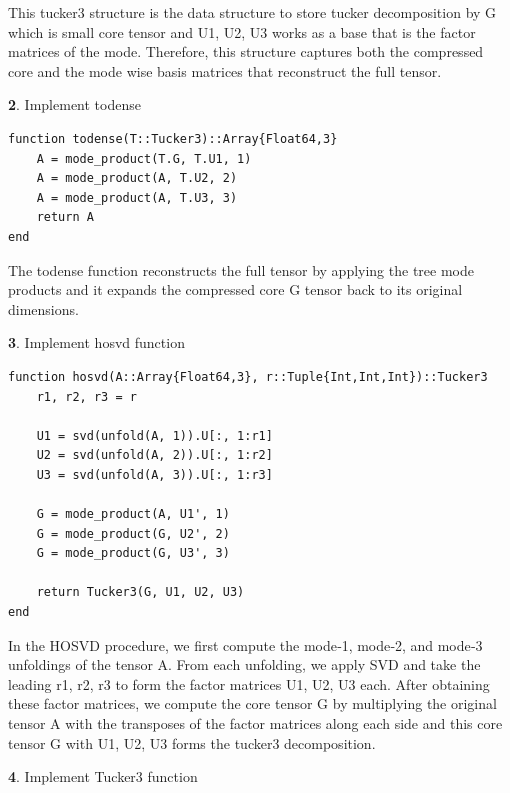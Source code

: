 \documentclass[11pt]{article}
\begin{document}
This tucker3 structure is the data structure to store tucker decomposition by G which is small core tensor and U1, U2, U3 works as a base that is the factor matrices of the mode. 
Therefore, this structure captures both the compressed core and the mode wise basis matrices that reconstruct the full tensor.

\vspace{1.5em}

\textbf{2}. Implement todense 

\begin{lstlisting}
function todense(T::Tucker3)::Array{Float64,3}
    A = mode_product(T.G, T.U1, 1)
    A = mode_product(A, T.U2, 2)
    A = mode_product(A, T.U3, 3)
    return A
end
\end{lstlisting}

The todense function reconstructs the full tensor by applying the tree mode products and it expands the compressed core G tensor back to its original dimensions.

\vspace{1.5em}

\textbf{3}. Implement hosvd function

\begin{lstlisting}
function hosvd(A::Array{Float64,3}, r::Tuple{Int,Int,Int})::Tucker3
    r1, r2, r3 = r

    U1 = svd(unfold(A, 1)).U[:, 1:r1]
    U2 = svd(unfold(A, 2)).U[:, 1:r2]
    U3 = svd(unfold(A, 3)).U[:, 1:r3]

    G = mode_product(A, U1', 1)
    G = mode_product(G, U2', 2)
    G = mode_product(G, U3', 3)

    return Tucker3(G, U1, U2, U3)
end
\end{lstlisting}

In the HOSVD procedure, we first compute the mode‑1, mode‑2, and mode‑3 unfoldings of the tensor A. From each unfolding, we apply SVD and take the leading r1, r2, r3 to form the factor matrices U1, U2, U3 each. After obtaining these factor matrices, we compute the core tensor G by multiplying the original tensor A with the transposes of the factor matrices along each side and this core tensor G with U1, U2, U3 forms the tucker3 decomposition.

\vspace{1.5em}

\textbf{4}. Implement Tucker3 function
\end{document}
